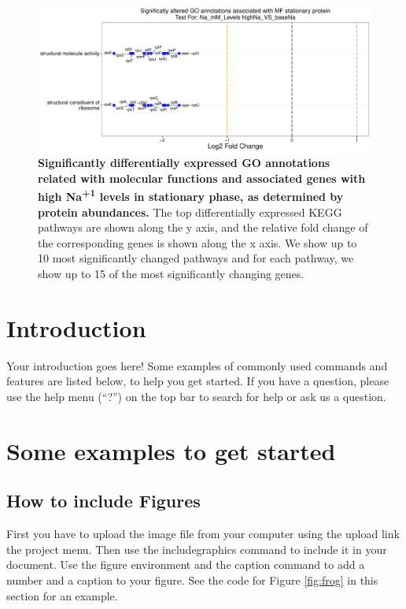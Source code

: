 \documentclass[a4paper]{article}
\begin{document}
\clearpage
\begin{figure}
	\includegraphics[width=1.0\textwidth]{../../d_figures/mf_n_05.pdf}
	\caption[Significantly altered GO annotations associated with molecular functions for protein samples in stationary phase tested for high Na\textsuperscript{+1} against base Na\textsuperscript{+1}]
	{\textbf{Significantly differentially expressed GO annotations related with molecular functions and associated genes with high Na\textsuperscript{+1} levels in stationary phase, as determined by protein abundances.} The top differentially expressed KEGG pathways are shown along the y axis, and the relative fold change of the corresponding genes is shown along the x axis. We show up to 10 most significantly changed pathways and for each pathway, we show up to 15 of the most significantly changing genes.}
\end{figure}



\clearpage
\section{Introduction}

Your introduction goes here! Some examples of commonly used commands and features are listed below, to help you get started. If you have a question, please use the help menu (``?'') on the top bar to search for help or ask us a question. 

\section{Some examples to get started}

\subsection{How to include Figures}

First you have to upload the image file from your computer using the upload link the project menu. Then use the includegraphics command to include it in your document. Use the figure environment and the caption command to add a number and a caption to your figure. See the code for Figure \ref{fig:frog} in this section for an example.
\end{document}
